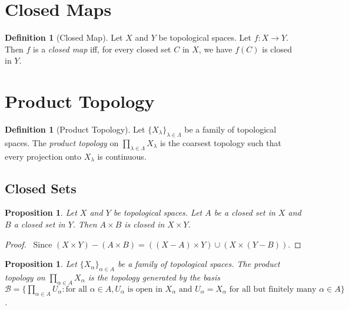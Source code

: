 \documentclass{book}
\let\qed\relax
\newtheorem{prop}[ax]{Proposition}
\theoremstyle{definition}
\newtheorem{df}[ax]{Definition}
\begin{document}
\section{Closed Maps}

\begin{df}[Closed Map]
Let $X$ and $Y$ be topological spaces. Let $f : X \rightarrow Y$. Then $f$ is a \emph{closed map} iff, for every closed set $C$ in $X$, we have $f(C)$ is closed in $Y$.
\end{df}

\section{Product Topology}

\begin{df}[Product Topology]
Let $\{ X_\lambda \}_{\lambda \in \Lambda}$ be a family of topological spaces. The \emph{product topology} on $\prod_{\lambda \in \Lambda} X_\lambda$ is the coarsest topology such that every projection onto $X_\lambda$ is continuous.
\end{df}

\subsection{Closed Sets}

\begin{prop}
\label{prop:closed_product}
Let $X$ and $Y$ be topological spaces. Let $A$ be a closed set in $X$ and $B$ a closed set in $Y$. Then $A \times B$ is closed in $X \times Y$.
\end{prop}

\begin{proof}
\pf\ Since $(X \times Y) - (A \times B) = ((X - A) \times Y) \cup (X \times (Y - B))$. \qed
\end{proof}

\begin{prop}
\label{prop:product_basis}
Let $\{ X_\alpha \}_{\alpha \in A}$ be a family of topological spaces. The product topology on $\prod_{\alpha \in A} X_\alpha$ is the topology generated by the basis $\mathcal{B} = \{ \prod_{\alpha \in A} U_\alpha : \text{for all } \alpha \in A, U_\alpha \text{ is open in } X_\alpha \text{ and } U_\alpha = X_\alpha \text{ for all but finitely many } \alpha \in A \}$.
\end{prop}
\end{document}

